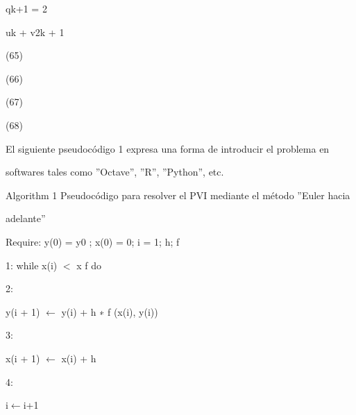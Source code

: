 \documentclass[a4paper,portrait,12pt]{article}
\begin{document}
\begin{flushleft}
qk+1 = 2
\end{flushleft}


\begin{flushleft}
uk + v2k + 1
\end{flushleft}





(65)


(66)


(67)


(68)





\begin{flushleft}
El siguiente pseudocódigo 1 expresa una forma de introducir el problema en
\end{flushleft}


\begin{flushleft}
softwares tales como ''Octave'', ''R'', ''Python'', etc.
\end{flushleft}





\begin{flushleft}
\newpage
Algorithm 1 Pseudocódigo para resolver el PVI mediante el método ''Euler hacia
\end{flushleft}


\begin{flushleft}
adelante''
\end{flushleft}


\begin{flushleft}
Require: y(0) = y0 ; x(0) = 0; i = 1; h; f
\end{flushleft}


\begin{flushleft}
1: while x(i) $<$ x f do
\end{flushleft}


2:


\begin{flushleft}
y(i + 1) $\leftarrow$ y(i) + h ∗ f (x(i), y(i))
\end{flushleft}


3:


\begin{flushleft}
x(i + 1) $\leftarrow$ x(i) + h
\end{flushleft}


4:


\begin{flushleft}
i$\leftarrow$i+1
\end{flushleft}
\end{document}

